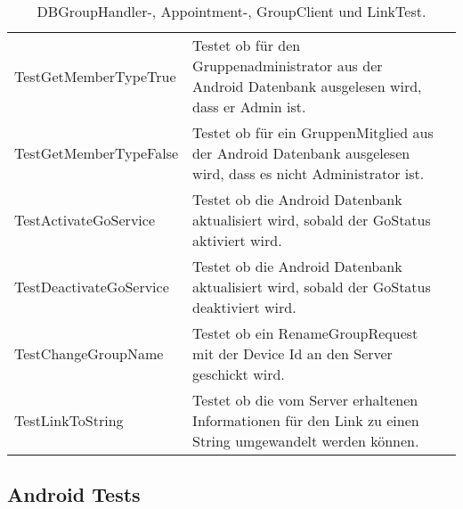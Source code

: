 \begin{table}[H]
{\begin{tabular}{|p{}|p{}|>{\centering}p{}|}
				\hspace{0pt}TestGetMemberTypeTrue & Testet ob für den Gruppenadministrator aus der Android Datenbank ausgelesen wird, dass er Admin ist. & \checkmark\tabularnewline
				\hspace{0pt}TestGetMemberTypeFalse & Testet ob für ein GruppenMitglied aus der Android Datenbank ausgelesen wird, dass es nicht Administrator ist. & \checkmark\tabularnewline
				\hspace{0pt}TestActivateGoService & Testet ob die Android Datenbank aktualisiert wird, sobald der GoStatus aktiviert wird. & \checkmark\tabularnewline
				\hspace{0pt}TestDeactivateGoService & Testet ob die Android Datenbank aktualisiert wird, sobald der GoStatus deaktiviert wird. & \checkmark\tabularnewline
				\hspace{0pt}TestChangeGroupName & Testet ob ein RenameGroupRequest mit der Device Id an den Server geschickt wird. & \checkmark\tabularnewline
				\hspace{0pt}TestLinkToString & Testet ob die vom Server erhaltenen Informationen für den Link zu einen String umgewandelt werden können. & \checkmark\tabularnewline
				\hline
			\end{tabular}}
			\caption{DBGroupHandler-, Appointment-, GroupClient und LinkTest.}
		\end{table}

\subsection{Android Tests}

